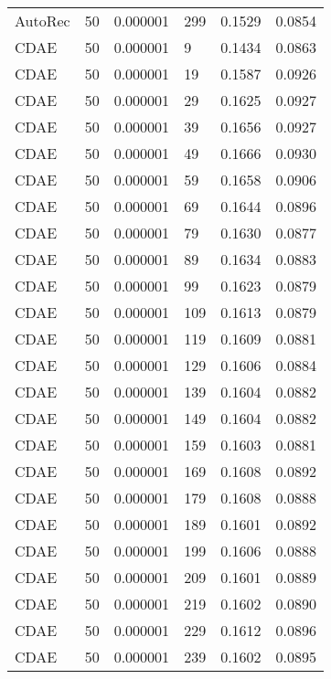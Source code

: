 \begin{tabular}{llrlrr}
 AutoRec &   50 &  0.000001 &   299 &  0.1529 &       0.0854 \\
    CDAE &   50 &  0.000001 &     9 &  0.1434 &       0.0863 \\
    CDAE &   50 &  0.000001 &    19 &  0.1587 &       0.0926 \\
    CDAE &   50 &  0.000001 &    29 &  0.1625 &       0.0927 \\
    CDAE &   50 &  0.000001 &    39 &  0.1656 &       0.0927 \\
    CDAE &   50 &  0.000001 &    49 &  0.1666 &       0.0930 \\
    CDAE &   50 &  0.000001 &    59 &  0.1658 &       0.0906 \\
    CDAE &   50 &  0.000001 &    69 &  0.1644 &       0.0896 \\
    CDAE &   50 &  0.000001 &    79 &  0.1630 &       0.0877 \\
    CDAE &   50 &  0.000001 &    89 &  0.1634 &       0.0883 \\
    CDAE &   50 &  0.000001 &    99 &  0.1623 &       0.0879 \\
    CDAE &   50 &  0.000001 &   109 &  0.1613 &       0.0879 \\
    CDAE &   50 &  0.000001 &   119 &  0.1609 &       0.0881 \\
    CDAE &   50 &  0.000001 &   129 &  0.1606 &       0.0884 \\
    CDAE &   50 &  0.000001 &   139 &  0.1604 &       0.0882 \\
    CDAE &   50 &  0.000001 &   149 &  0.1604 &       0.0882 \\
    CDAE &   50 &  0.000001 &   159 &  0.1603 &       0.0881 \\
    CDAE &   50 &  0.000001 &   169 &  0.1608 &       0.0892 \\
    CDAE &   50 &  0.000001 &   179 &  0.1608 &       0.0888 \\
    CDAE &   50 &  0.000001 &   189 &  0.1601 &       0.0892 \\
    CDAE &   50 &  0.000001 &   199 &  0.1606 &       0.0888 \\
    CDAE &   50 &  0.000001 &   209 &  0.1601 &       0.0889 \\
    CDAE &   50 &  0.000001 &   219 &  0.1602 &       0.0890 \\
    CDAE &   50 &  0.000001 &   229 &  0.1612 &       0.0896 \\
    CDAE &   50 &  0.000001 &   239 &  0.1602 &       0.0895 \\

\end{tabular}
